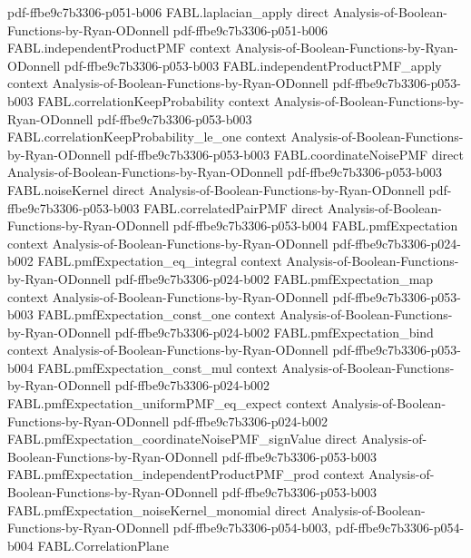 \begin{theorem}
  {pdf-ffbe9c7b3306-p051-b006}
\proofstep
  {FABL.laplacian_apply}
  {direct}
  {Analysis-of-Boolean-Functions-by-Ryan-ODonnell}
  {pdf-ffbe9c7b3306-p051-b006}
\proofstep
  {FABL.independentProductPMF}
  {context}
  {Analysis-of-Boolean-Functions-by-Ryan-ODonnell}
  {pdf-ffbe9c7b3306-p053-b003}
\proofstep
  {FABL.independentProductPMF_apply}
  {context}
  {Analysis-of-Boolean-Functions-by-Ryan-ODonnell}
  {pdf-ffbe9c7b3306-p053-b003}
\proofstep
  {FABL.correlationKeepProbability}
  {context}
  {Analysis-of-Boolean-Functions-by-Ryan-ODonnell}
  {pdf-ffbe9c7b3306-p053-b003}
\proofstep
  {FABL.correlationKeepProbability_le_one}
  {context}
  {Analysis-of-Boolean-Functions-by-Ryan-ODonnell}
  {pdf-ffbe9c7b3306-p053-b003}
\proofstep
  {FABL.coordinateNoisePMF}
  {direct}
  {Analysis-of-Boolean-Functions-by-Ryan-ODonnell}
  {pdf-ffbe9c7b3306-p053-b003}
\proofstep
  {FABL.noiseKernel}
  {direct}
  {Analysis-of-Boolean-Functions-by-Ryan-ODonnell}
  {pdf-ffbe9c7b3306-p053-b003}
\proofstep
  {FABL.correlatedPairPMF}
  {direct}
  {Analysis-of-Boolean-Functions-by-Ryan-ODonnell}
  {pdf-ffbe9c7b3306-p053-b004}
\proofstep
  {FABL.pmfExpectation}
  {context}
  {Analysis-of-Boolean-Functions-by-Ryan-ODonnell}
  {pdf-ffbe9c7b3306-p024-b002}
\proofstep
  {FABL.pmfExpectation_eq_integral}
  {context}
  {Analysis-of-Boolean-Functions-by-Ryan-ODonnell}
  {pdf-ffbe9c7b3306-p024-b002}
\proofstep
  {FABL.pmfExpectation_map}
  {context}
  {Analysis-of-Boolean-Functions-by-Ryan-ODonnell}
  {pdf-ffbe9c7b3306-p053-b003}
\proofstep
  {FABL.pmfExpectation_const_one}
  {context}
  {Analysis-of-Boolean-Functions-by-Ryan-ODonnell}
  {pdf-ffbe9c7b3306-p024-b002}
\proofstep
  {FABL.pmfExpectation_bind}
  {context}
  {Analysis-of-Boolean-Functions-by-Ryan-ODonnell}
  {pdf-ffbe9c7b3306-p053-b004}
\proofstep
  {FABL.pmfExpectation_const_mul}
  {context}
  {Analysis-of-Boolean-Functions-by-Ryan-ODonnell}
  {pdf-ffbe9c7b3306-p024-b002}
\proofstep
  {FABL.pmfExpectation_uniformPMF_eq_expect}
  {context}
  {Analysis-of-Boolean-Functions-by-Ryan-ODonnell}
  {pdf-ffbe9c7b3306-p024-b002}
\proofstep
  {FABL.pmfExpectation_coordinateNoisePMF_signValue}
  {direct}
  {Analysis-of-Boolean-Functions-by-Ryan-ODonnell}
  {pdf-ffbe9c7b3306-p053-b003}
\proofstep
  {FABL.pmfExpectation_independentProductPMF_prod}
  {context}
  {Analysis-of-Boolean-Functions-by-Ryan-ODonnell}
  {pdf-ffbe9c7b3306-p053-b003}
\proofstep
  {FABL.pmfExpectation_noiseKernel_monomial}
  {direct}
  {Analysis-of-Boolean-Functions-by-Ryan-ODonnell}
  {pdf-ffbe9c7b3306-p054-b003,
    pdf-ffbe9c7b3306-p054-b004}
\proofstep
  {FABL.CorrelationPlane}

\end{theorem}
